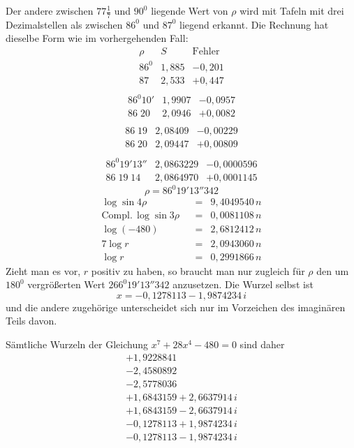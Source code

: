 Der andere zwischen $77\frac{1}{7}$ und $90^{0}$ liegende Wert von $\rho$ wird mit Tafeln mit drei Dezimalstellen als zwischen $86^{0}$ und $87^{0}$ liegend erkannt. Die Rechnung hat dieselbe Form wie im vorhergehenden Fall:
\[
\begin{array}{c|r|r}
\rho&S&\mathrm{Fehler}\\
86^{0}&1{,}885&-0{,}201\\
87&2{,}533&+0{,}447\\
\end{array}
\]
\[
\begin{array}{c|r|r}
86^{0}10'&1{,}9907&-0{,}0957\\
86\;20&2{,}0946&+0{,}0082\\
\end{array}
\]
\[
\begin{array}{c|r|r}
86\;19&2{,}08409&-0{,}00229\\
86\;20&2{,}09447&+0{,}00809\\
\end{array}
\]
\[
\begin{array}{c|r|r}
86^{0}19'13''&2{,}0863229&-0{,}0000596\\
86\;19\;14&2{,}0864970&+0{,}0001145
\end{array}
\]
\[
\rho=86^{0}19'13''342
\]
\[
\begin{array}{lrcl}
\log\sin4\rho&&=&9{,}4049540\,n\\
\mathrm{Compl.}\,\log\sin3\rho&&=&0{,}0081108\,n\\
\log(-480)&&=&2{,}6812412\,n\\\hline
7\log r&&=&2{,}0943060\,n\\
\log r&&=&0{,}2991866\,n
\end{array}
\]
Zieht man es vor, $r$ positiv zu haben, so braucht man nur zugleich für $\rho$ den um $180^{0}$ vergrößerten Wert $266^{0}19'13''342$ anzusetzen. Die Wurzel selbst ist
\[
x=-0{,}1278113-1{,}9874234\,i
\]
und die andere zugehörige unterscheidet sich nur im Vorzeichen des imaginären Teils davon.
\par{}
Sämtliche Wurzeln der Gleichung $x^7+28x^4-480=0$ sind daher
\[
\begin{array}{l}
+1{,}9228841\\
-2{,}4580892\\
-2{,}5778036\\
+1{,}6843159+2{,}6637914\,i\\
+1{,}6843159-2{,}6637914\,i\\
-0{,}1278113+1{,}9874234\,i\\
-0{,}1278113-1{,}9874234\,i
\end{array}
\]
